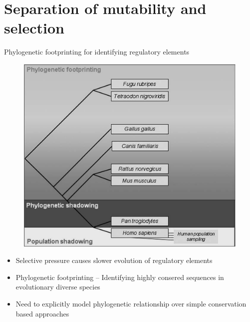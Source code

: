 \documentclass[10pt]{beamer}
\begin{document}
\section{Separation of mutability and selection}

{

\begin{frame}[fragile]{Phylogenetic footprinting for identifying regulatory elements}
      \begin{figure}
      	\includegraphics[scale=0.1]{images/phylo-shadowing}
      \end{figure}
	  \begin{itemize}
      \item Selective pressure causes slower evolution of regulatory elements
      \item Phylogenetic footprinting -- Identifying highly consered sequences in evolutionary diverse species
      \item Need to explicitly model phylogenetic relationship over simple conservation based approaches
      \end{itemize}
\end{frame}
}
\end{document}
